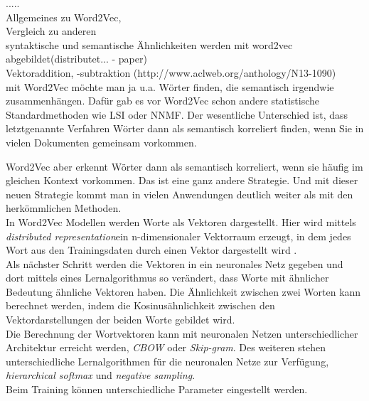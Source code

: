 \documentclass[12pt,a4paper]{report}
\begin{document}
.....\\
Allgemeines zu Word2Vec,\\
 Vergleich zu anderen\\
  syntaktische und semantische Ähnlichkeiten werden mit word2vec abgebildet(distributet... - paper)\\
  Vektoraddition, -subtraktion (http://www.aclweb.org/anthology/N13-1090)\\
  



mit Word2Vec möchte man ja u.a. Wörter finden, die semantisch irgendwie zusammenhängen. Dafür gab es vor Word2Vec schon andere statistische Standardmethoden wie LSI oder NNMF. Der wesentliche Unterschied ist, dass letztgenannte Verfahren Wörter dann als semantisch korreliert finden, wenn Sie in vielen Dokumenten gemeinsam vorkommen.

 Word2Vec aber erkennt Wörter dann als semantisch korreliert, wenn sie häufig im gleichen Kontext vorkommen. 
 Das ist eine ganz andere Strategie. 
 Und mit dieser neuen Strategie kommt man in vielen Anwendungen deutlich weiter als mit den herkömmlichen Methoden.\\





In Word2Vec Modellen werden Worte als Vektoren dargestellt. Hier wird mittels \textit{distributed representation}ein n-dimensionaler Vektorraum erzeugt, in dem jedes Wort aus den Trainingsdaten durch einen Vektor dargestellt wird \cite{DBLP:journals/corr/abs-1301-3781}. \\
Als nächster Schritt werden die Vektoren in ein neuronales Netz gegeben und dort mittels eines Lernalgorithmus so verändert, dass Worte mit ähnlicher Bedeutung ähnliche Vektoren haben. Die Ähnlichkeit zwischen zwei Worten kann berechnet werden, indem die Kosinusähnlichkeit zwischen den Vektordarstellungen der beiden Worte gebildet wird.\\


Die Berechnung der Wortvektoren kann mit neuronalen Netzen unterschiedlicher Architektur erreicht werden, \textit{CBOW} oder \textit{Skip-gram}. Des weiteren stehen unterschiedliche Lernalgorithmen für die neuronalen Netze zur Verfügung, \textit{hierarchical softmax}  und \textit{negative sampling}.\\
Beim Training können unterschiedliche Parameter eingestellt werden.\\
\end{document}
